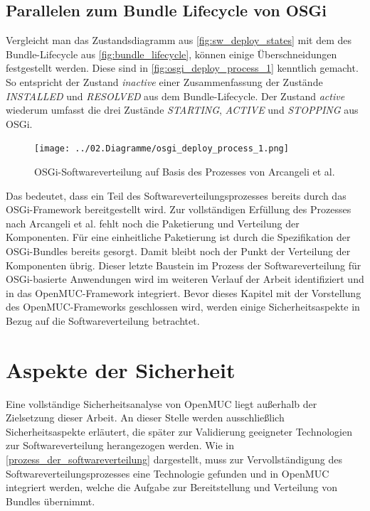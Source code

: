 \subsection{Parallelen zum Bundle Lifecycle von OSGi}

Vergleicht man das Zustandsdiagramm aus \autoref{fig:sw_deploy_states} mit dem des Bundle-Lifecycle aus \autoref{fig:bundle_lifecycle}, können einige Überschneidungen festgestellt werden.
Diese sind in \autoref{fig:osgi_deploy_process_1} kenntlich gemacht. So entspricht der Zustand \textit{inactive} einer Zusammenfassung der Zustände \textit{INSTALLED} und \textit{RESOLVED}
aus dem Bundle-Lifecycle.
Der Zustand \textit{active} wiederum umfasst die drei Zustände \textit{STARTING}, \textit{ACTIVE} und \textit{STOPPING} aus \ac{OSGi}.

\begin{figure}[h]
 \centering
 \texttt{[image: ../02.Diagramme/osgi\_deploy\_process\_1.png]}
 \caption{\ac{OSGi}-Softwareverteilung auf Basis des Prozesses von Arcangeli et al. \cite{sw_dist}}
 \label{fig:osgi_deploy_process_1}
\end{figure}

Das bedeutet, dass ein Teil des Softwareverteilungsprozesses bereits durch das \ac{OSGi}-Framework bereitgestellt wird. 
Zur vollständigen Erfüllung des Prozesses nach Arcangeli et al. \cite{sw_dist} fehlt noch die Paketierung und Verteilung der Komponenten.
Für eine einheitliche Paketierung ist durch die Spezifikation der \ac{OSGi}-Bundles bereits gesorgt. Damit bleibt noch der Punkt der Verteilung der Komponenten übrig.
Dieser letzte Baustein im Prozess der Softwareverteilung für \ac{OSGi}-basierte Anwendungen wird im weiteren Verlauf der Arbeit identifiziert und in 
das OpenMUC-Framework integriert. Bevor dieses Kapitel mit der Vorstellung des OpenMUC-Frameworks geschlossen wird, 
werden einige Sicherheitsaspekte in Bezug auf die Softwareverteilung betrachtet.

\section{Aspekte der Sicherheit}
\label{sicherheit}
Eine vollständige Sicherheitsanalyse von OpenMUC liegt außerhalb der Zielsetzung dieser Arbeit.
An dieser Stelle werden ausschließlich Sicherheitsaspekte erläutert, die später zur Validierung geeigneter Technologien zur Softwareverteilung 
herangezogen werden. Wie in \autoref{prozess_der_softwareverteilung} dargestellt, muss zur Vervollständigung des Softwareverteilungsprozesses
eine Technologie gefunden und in OpenMUC integriert werden, welche die Aufgabe zur Bereitstellung und Verteilung von Bundles übernimmt. \\

